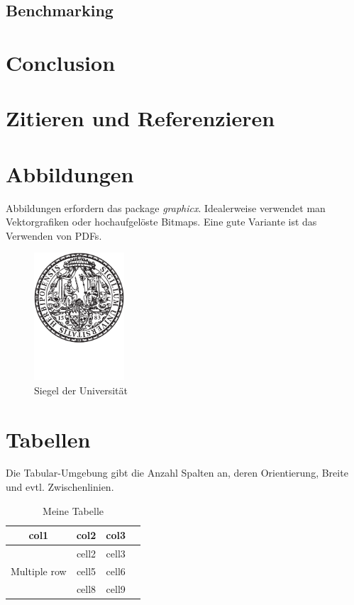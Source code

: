 \documentclass[12pt,oneside]{article}
\begin{document}
\subsection{Benchmarking}

\section{Conclusion}

\section{Zitieren und Referenzieren}



\section{Abbildungen}

Abbildungen erfordern das package \textit{graphicx}. 
Idealerweise verwendet man Vektorgrafiken oder hochaufgelöste Bitmaps. 
Eine gute Variante ist das Verwenden von PDFs.

\begin{figure}[h]
    \centering
    \includegraphics[width=0.3\textwidth]{siegel.pdf}
    \caption{Siegel der Universität}
    \label{fig:my_label}
\end{figure}


\section{Tabellen}

Die Tabular-Umgebung gibt die Anzahl Spalten an, deren Orientierung, Breite und evtl. Zwischenlinien. 


\begin{table}[ht]
    \centering
    \caption{Meine Tabelle}
        \begin{tabular}{ cccc } 
        \toprule
        col1 & col2 & col3 \\
        \midrule
        \multirow{3}{4em}{Multiple row} & cell2 & cell3 \\ 
        & cell5 & cell6 \\ 
        & cell8 & cell9 \\ 
        \bottomrule
    \end{tabular}
    \label{tab:countries}
\end{table}
\end{document}
